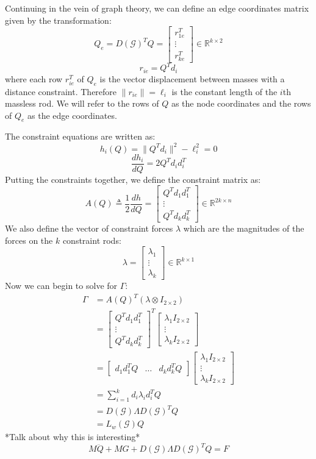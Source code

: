 \documentclass[conference]{IEEEtran}
\begin{document}
Continuing in the vein of graph theory, we can define an edge coordinates matrix given by the transformation:
$$Q_e=D(\mathcal{G})^TQ=\begin{bmatrix}
    r_{1e}^T\\ \vdots\\ r_{ke}^T
\end{bmatrix}\in\mathbb{R}^{k\times2}$$
$$r_{ie}=Q^Td_i$$
where each row $r_{ie}^T$ of $Q_e$ is the vector displacement between masses with a distance constraint. Therefore $\|r_{ie}\|=\ell_i$ is the constant length of the $i$th massless rod. We will refer to the rows of $Q$ as the node coordinates and the rows of $Q_e$ as the edge coordinates.

The constraint equations are written as:
$$h_i(Q)=\|Q^Td_i\|^2-\ell_i^2=0$$
$$\frac{dh_i}{dQ}=2Q^Td_id_i^T$$
Putting the constraints together, we define the constraint matrix as:
$$A(Q)\triangleq\frac{1}{2}\frac{dh}{dQ}=\begin{bmatrix}
    Q^Td_1d_1^T\\ \vdots\\ Q^Td_kd_k^T
\end{bmatrix}\in\mathbb{R}^{2k\times n}$$
We also define the vector of constraint forces $\lambda$ which are the magnitudes of the forces on the $k$ constraint rods:
$$\lambda=\begin{bmatrix}
    \lambda_1\\ \vdots\\ \lambda_k
\end{bmatrix}\in\mathbb{R}^{k\times 1}$$
Now we can begin to solve for $\Gamma$:
\begin{align*}
    \Gamma&=A(Q)^T(\lambda\otimes I_{2\times2})\\
    &=\begin{bmatrix}
        Q^Td_1d_1^T\\ \vdots\\ Q^Td_kd_k^T
    \end{bmatrix}^T\begin{bmatrix}
        \lambda_1I_{2\times2}\\ \vdots\\ \lambda_kI_{2\times2}
    \end{bmatrix}\\
    &=\begin{bmatrix}
        d_1d_1^TQ & \hdots & d_kd_k^TQ
    \end{bmatrix}\begin{bmatrix}
        \lambda_1I_{2\times2}\\ \vdots\\ \lambda_kI_{2\times2}
    \end{bmatrix}\\
    &= \sum_{i=1}^k d_i\lambda_id_i^TQ\\
    &= D(\mathcal{G})\Lambda D(\mathcal{G})^TQ\\
    &= L_w(\mathcal{G})Q
\end{align*}
*Talk about why this is interesting*
$$M\ddot{Q}+MG+D(\mathcal{G})\Lambda D(\mathcal{G})^TQ=F$$
\end{document}
